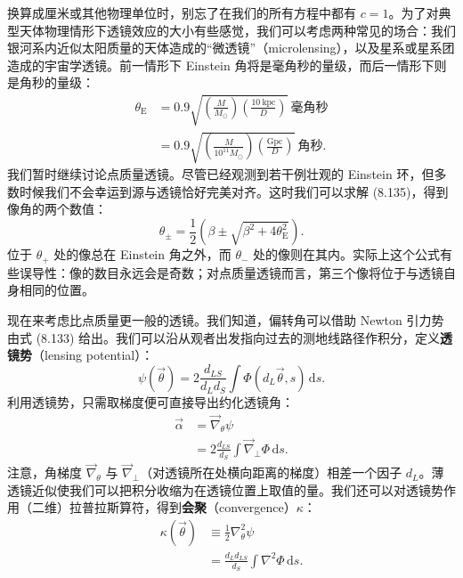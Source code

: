 换算成厘米或其他物理单位时，别忘了在我们的所有方程中都有 $c=1$。为了对典型天体物理情形下透镜效应的大小有些感觉，我们可以考虑两种常见的场合：我们银河系内近似太阳质量的天体造成的“微透镜”（microlensing），以及星系或星系团造成的宇宙学透镜。前一情形下 Einstein 角将是毫角秒的量级，而后一情形下则是角秒的量级：
\begin{align*}
\theta_{\mathrm{E}} &= 0.9\sqrt{\left(\frac{M}{M_{\odot}}\right)\left(\frac{10\ \mathrm{kpc}}{D}\right)}\ \text{毫角秒}\\
&= 0.9\sqrt{\left(\frac{M}{10^{11}M_{\odot}}\right)\left(\frac{\mathrm{Gpc}}{D}\right)}\ \text{角秒}.
\tag{8.138}
\end{align*}
我们暂时继续讨论点质量透镜。尽管已经观测到若干例壮观的 Einstein 环，但多数时候我们不会幸运到源与透镜恰好完美对齐。这时我们可以求解 (8.135)，得到像角的两个数值：
\begin{equation*}
\theta_{\pm} = \frac{1}{2}\left(\beta \pm \sqrt{\beta^{2}+4\theta_{\mathrm{E}}^{2}}\right).
\tag{8.139}
\end{equation*}
位于 $\theta_{+}$ 处的像总在 Einstein 角之外，而 $\theta_{-}$ 处的像则在其内。实际上这个公式有些误导性：像的数目永远会是奇数；对点质量透镜而言，第三个像将位于与透镜自身相同的位置。

现在来考虑比点质量更一般的透镜。我们知道，偏转角可以借助 Newton 引力势由式 (8.133) 给出。我们可以沿从观者出发指向过去的测地线路径作积分，定义\textbf{透镜势}（lensing potential）：
\begin{equation*}
\psi(\vec{\theta}) = 2\frac{d_{LS}}{d_L d_S}\int \Phi(d_L\vec{\theta},s)\,\mathrm{d}s.
\tag{8.140}
\end{equation*}
利用透镜势，只需取梯度便可直接导出约化透镜角：
\begin{align*}
\vec{\alpha} &= \vec{\nabla}_{\theta}\psi\\
&= 2\frac{d_{LS}}{d_S}\int \vec{\nabla}_{\perp}\Phi\,\mathrm{d}s.
\tag{8.141}
\end{align*}
注意，角梯度 $\vec{\nabla}_{\theta}$ 与 $\vec{\nabla}_{\perp}$（对透镜所在处横向距离的梯度）相差一个因子 $d_L$。薄透镜近似使我们可以把积分收缩为在透镜位置上取值的量。我们还可以对透镜势作用（二维）拉普拉斯算符，得到\textbf{会聚}（convergence）$\kappa$：
\begin{align*}
\kappa(\vec{\theta}) &\equiv \frac{1}{2}\nabla_{\theta}^{2}\psi\\
&= \frac{d_L d_{LS}}{d_S}\int \nabla^{2}\Phi\,\mathrm{d}s.
\tag{8.142}
\end{align*}

